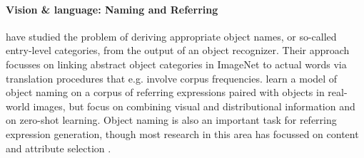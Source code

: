 \paragraph{Vision \& language: Naming and Referring}

 have studied the problem of deriving appropriate object names, or so-called entry-level
 categories, from the output of an object recognizer. Their approach focusses on linking abstract object categories in ImageNet to actual words via translation procedures that e.g. involve corpus frequencies. 
  learn a model of object naming on a corpus of referring expressions paired with objects in real-world images, but focus on combining visual and distributional information and on zero-shot learning.
Object naming is also an important task for referring expression generation, though most research in this area has focussed on content and attribute selection \cite{Kazemzadeh2014,gkatzia:2015,zarrieschlang:easy-pre,Maoetal:cocorefexp}. 



